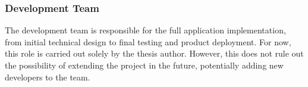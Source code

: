 \subsubsection{Development Team}

The development team is responsible for the full application implementation, from initial technical design to final testing and product deployment. For now, this role is carried out solely by the thesis author. However, this does not rule out the possibility of extending the project in the future, potentially adding new developers to the team.
